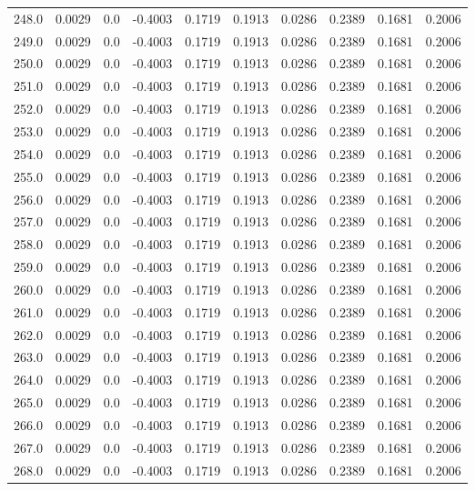 \begin{longtable}{lrrrrrrrrr}
248.0 & 0.0029 & 0.0 & -0.4003 & 0.1719 & 0.1913 & 0.0286 & 0.2389 & 0.1681 & 0.2006 \\
249.0 & 0.0029 & 0.0 & -0.4003 & 0.1719 & 0.1913 & 0.0286 & 0.2389 & 0.1681 & 0.2006 \\
250.0 & 0.0029 & 0.0 & -0.4003 & 0.1719 & 0.1913 & 0.0286 & 0.2389 & 0.1681 & 0.2006 \\
251.0 & 0.0029 & 0.0 & -0.4003 & 0.1719 & 0.1913 & 0.0286 & 0.2389 & 0.1681 & 0.2006 \\
252.0 & 0.0029 & 0.0 & -0.4003 & 0.1719 & 0.1913 & 0.0286 & 0.2389 & 0.1681 & 0.2006 \\
253.0 & 0.0029 & 0.0 & -0.4003 & 0.1719 & 0.1913 & 0.0286 & 0.2389 & 0.1681 & 0.2006 \\
254.0 & 0.0029 & 0.0 & -0.4003 & 0.1719 & 0.1913 & 0.0286 & 0.2389 & 0.1681 & 0.2006 \\
255.0 & 0.0029 & 0.0 & -0.4003 & 0.1719 & 0.1913 & 0.0286 & 0.2389 & 0.1681 & 0.2006 \\
256.0 & 0.0029 & 0.0 & -0.4003 & 0.1719 & 0.1913 & 0.0286 & 0.2389 & 0.1681 & 0.2006 \\
257.0 & 0.0029 & 0.0 & -0.4003 & 0.1719 & 0.1913 & 0.0286 & 0.2389 & 0.1681 & 0.2006 \\
258.0 & 0.0029 & 0.0 & -0.4003 & 0.1719 & 0.1913 & 0.0286 & 0.2389 & 0.1681 & 0.2006 \\
259.0 & 0.0029 & 0.0 & -0.4003 & 0.1719 & 0.1913 & 0.0286 & 0.2389 & 0.1681 & 0.2006 \\
260.0 & 0.0029 & 0.0 & -0.4003 & 0.1719 & 0.1913 & 0.0286 & 0.2389 & 0.1681 & 0.2006 \\
261.0 & 0.0029 & 0.0 & -0.4003 & 0.1719 & 0.1913 & 0.0286 & 0.2389 & 0.1681 & 0.2006 \\
262.0 & 0.0029 & 0.0 & -0.4003 & 0.1719 & 0.1913 & 0.0286 & 0.2389 & 0.1681 & 0.2006 \\
263.0 & 0.0029 & 0.0 & -0.4003 & 0.1719 & 0.1913 & 0.0286 & 0.2389 & 0.1681 & 0.2006 \\
264.0 & 0.0029 & 0.0 & -0.4003 & 0.1719 & 0.1913 & 0.0286 & 0.2389 & 0.1681 & 0.2006 \\
265.0 & 0.0029 & 0.0 & -0.4003 & 0.1719 & 0.1913 & 0.0286 & 0.2389 & 0.1681 & 0.2006 \\
266.0 & 0.0029 & 0.0 & -0.4003 & 0.1719 & 0.1913 & 0.0286 & 0.2389 & 0.1681 & 0.2006 \\
267.0 & 0.0029 & 0.0 & -0.4003 & 0.1719 & 0.1913 & 0.0286 & 0.2389 & 0.1681 & 0.2006 \\
268.0 & 0.0029 & 0.0 & -0.4003 & 0.1719 & 0.1913 & 0.0286 & 0.2389 & 0.1681 & 0.2006 \\

\end{longtable}

